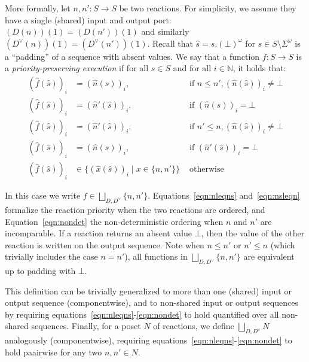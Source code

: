 More formally, let $n, n' : S \rightarrow S$ be two reactions.
For simplicity, we assume they have a single (shared) input and output port: $(D(n))(1) = (D(n'))(1)$ and similarly $(D^\vee(n))(1) = (D^\vee(n'))(1)$.
Recall that $\hat s = s.(\bot)^\omega$ for $s \in S \setminus \Sigma^\omega$ is a ``padding'' of a sequence with absent values.
We say that a function $f : S \rightarrow S$ is a \emph{priority-preserving execution} if for all $s \in S$ and for all $i \in \mathbb{N}$, it holds that:
\begin{align}
\label{eqn:nleqns} (\hat f(\hat s))_i &  =  (\hat n(\hat s))_i, & \text{ if } n \leq n', (\hat n(\hat s))_i \neq \bot \\
\label{eqn:nleqnsbot} (\hat f(\hat s))_i &  =  (\hat n'(\hat s))_i, & \text{ if } (\hat n(\hat s))_i = \bot \\
\label{eqn:nsleqn} (\hat f(\hat s))_i &  =  (\hat n'(\hat s))_i, & \text{ if } n' \leq n, (\hat n(\hat s))_i \neq \bot \\
\label{eqn:nleqnsbot} (\hat f(\hat s))_i &  =  (\hat n(\hat s))_i, & \text{ if } (\hat n'(\hat s))_i = \bot \\
\label{eqn:nondet} (\hat f(\hat s))_i &  \in \{ (\hat x(\hat s))_i \mid x \in \{n,n'\} \} & \text{ otherwise }
\end{align}

In this case we write $f \in \bigsqcup_{D,D^\vee} \{n, n'\}$.
Equations~\ref{eqn:nleqns} and~\ref{eqn:nsleqn} formalize the reaction priority when the two reactions are ordered, and Equation~\ref{eqn:nondet} the non-deterministic ordering when $n$ and $n'$ are incomparable.
If a reaction returns an absent value $\bot$, then the value of the other reaction is written on the output sequence.
Note when $n \leq n'$ or $n' \leq n$ (which trivially includes the case $n = n'$), all functions in $\bigsqcup_{D,D^\vee} \{n,n'\}$ are equivalent up to padding with $\bot$. 

This definition can be trivially generalized to more than one (shared) input or output sequence (componentwise), and to non-shared input or output sequences by requiring equations~\ref{eqn:nleqns}-\ref{eqn:nondet} to hold quantified over all non-shared sequences.
Finally, for a \ac{poset} $N$ of reactions, we define $\bigsqcup_{D,D^\vee} N$ analogously (componentwise), requiring equations~\ref{eqn:nleqns}-\ref{eqn:nondet} to hold paairwise for any two $n, n' \in N$.

